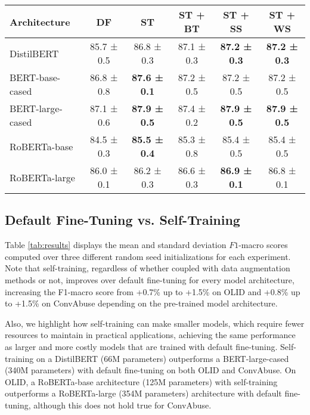 \documentclass[11pt,a4paper]{article}
\begin{document}
\begin{table*}
\begin{tabular}{@{}lccccc@{}}
Architecture     & DF         & ST                  & ST + BT     & ST + SS             & ST + WS             \\ \midrule
DistilBERT  & 85.7\footnotesize{ ± 0.5} & 86.8\footnotesize{ ± 0.3}          & 87.1\footnotesize{ ± 0.3}  & \textbf{87.2\footnotesize{ ± 0.3}} & \textbf{87.2\footnotesize{ ± 0.3}} \\
BERT-base-cased  & 86.8\footnotesize{ ± 0.8} & \textbf{87.6\footnotesize{ ± 0.1}} & 87.2\footnotesize{ ± 0.5}  & 87.2\footnotesize{ ± 0.5}          & 87.2\footnotesize{ ± 0.5}          \\
BERT-large-cased & 87.1\footnotesize{ ± 0.6} & \textbf{87.9\footnotesize{ ± 0.5}} & 87.4\footnotesize{ ± 0.2}  & \textbf{87.9\footnotesize{ ± 0.5}} & \textbf{87.9\footnotesize{ ± 0.5}} \\
RoBERTa-base     & 84.5\footnotesize{ ± 0.3} & \textbf{85.5\footnotesize{ ± 0.4}} & 85.3\footnotesize{ ± 0.8}  & 85.4\footnotesize{ ± 0.5}          & 85.4\footnotesize{ ± 0.5}          \\
RoBERTa-large    & 86.0\footnotesize{ ± 0.1} & 86.2\footnotesize{ ± 0.3}          & 86.6\footnotesize{ ± 0.3} & \textbf{86.9\footnotesize{ ± 0.1}} & 86.8\footnotesize{ ± 0.1}         \\ \bottomrule
\end{tabular}
\caption{Mean ± 1 std F1-Macro scores obtained over three random seed initializations.\\ \centering DF=Default Fine-Tuning, ST=Self-Training, BT=Backtranslation, SS=Synonym Substitution, WS=Word Swap}
\label{tab:results}
\end{table*}

\subsection{Default Fine-Tuning vs. Self-Training} \label{sec:dfvsst}
Table \ref{tab:results} displays the mean and standard deviation $F1$-macro scores computed over three different random seed initializations for each experiment. Note that self-training, regardless of whether coupled with data augmentation methods or not, improves over default fine-tuning for every model architecture, increasing the F1-macro score from +0.7\% up to +1.5\% on OLID and +0.8\% up to +1.5\% on ConvAbuse depending on the pre-trained model architecture.

Also, we highlight how self-training can make smaller models, which require fewer resources to maintain in practical applications, achieving the same performance as larger and more costly models that are trained with default fine-tuning. Self-training on a DistilBERT (66M parameters) outperforms a BERT-large-cased (340M parameters) with default fine-tuning on both OLID and ConvAbuse. On OLID, a RoBERTa-base architecture (125M parameters) with self-training outperforms a RoBERTa-large (354M parameters) architecture with default fine-tuning, although this does not hold true for ConvAbuse.
\end{document}
